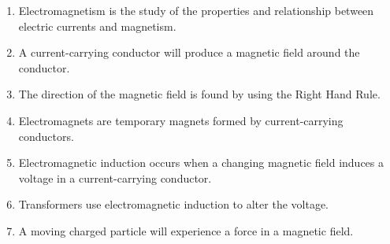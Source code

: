\begin {enumerate}
\item Electromagnetism is the study of the properties and relationship between electric currents and magnetism.
\item A current-carrying conductor will produce a magnetic field around the conductor.
\item The direction of the magnetic field is found by using the Right Hand Rule.
\item Electromagnets are temporary magnets formed by current-carrying conductors.
\item Electromagnetic induction occurs when a changing magnetic field induces a voltage in a current-carrying conductor.
\item Transformers use electromagnetic induction to alter the voltage.
\item A moving charged particle will experience a force in a magnetic field.
\end {enumerate}

